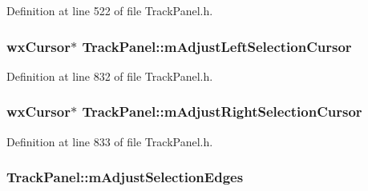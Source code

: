 Definition at line 522 of file Track\+Panel.\+h.

\subsubsection[{\texorpdfstring{m\+Adjust\+Left\+Selection\+Cursor}{mAdjustLeftSelectionCursor}}]{\setlength{\rightskip}{0pt plus 5cm}wx\+Cursor$\ast$ Track\+Panel\+::m\+Adjust\+Left\+Selection\+Cursor\hspace{0.3cm}{\ttfamily [protected]}}\hypertarget{class_track_panel_a285bee406a7006b3446a184e4b82ef7a}{}\label{class_track_panel_a285bee406a7006b3446a184e4b82ef7a}


Definition at line 832 of file Track\+Panel.\+h.

\subsubsection[{\texorpdfstring{m\+Adjust\+Right\+Selection\+Cursor}{mAdjustRightSelectionCursor}}]{\setlength{\rightskip}{0pt plus 5cm}wx\+Cursor$\ast$ Track\+Panel\+::m\+Adjust\+Right\+Selection\+Cursor\hspace{0.3cm}{\ttfamily [protected]}}\hypertarget{class_track_panel_a3d6d67cfbb88101960b3854cc6ec14c2}{}\label{class_track_panel_a3d6d67cfbb88101960b3854cc6ec14c2}


Definition at line 833 of file Track\+Panel.\+h.

\subsubsection[{\texorpdfstring{m\+Adjust\+Selection\+Edges}{mAdjustSelectionEdges}}]{ Track\+Panel\+::m\+Adjust\+Selection\+Edges\hspace{0.3cm}{\ttfamily [protected]}}\hypertarget{class_track_panel_aaf3e6420d428eefbd10dc13f558fba06}{}\label{class_track_panel_aaf3e6420d428eefbd10dc13f558fba06}



